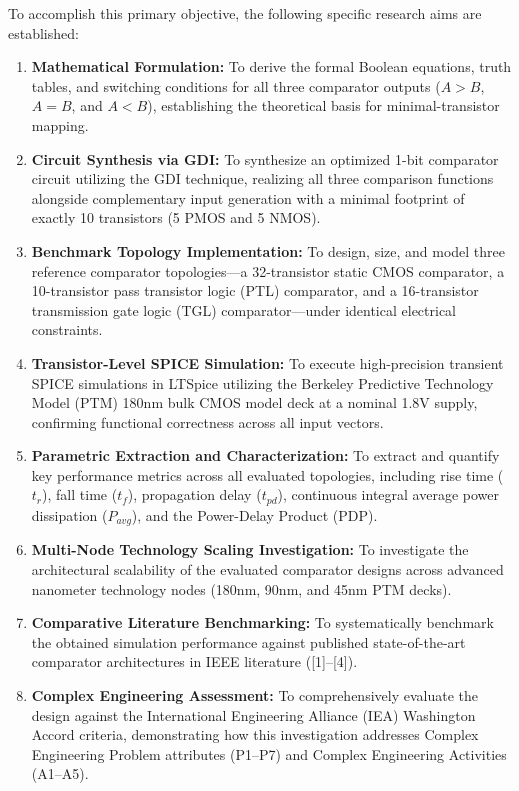 \documentclass[12pt,a4paper,oneside]{report}
\begin{document}
To accomplish this primary objective, the following specific research aims are established:
\begin{enumerate}
\item \textbf{Mathematical Formulation:} To derive the formal Boolean equations, truth tables, and switching conditions for all three comparator outputs ($A>B$, $A=B$, and $A<B$), establishing the theoretical basis for minimal-transistor mapping.
\item \textbf{Circuit Synthesis via GDI:} To synthesize an optimized 1-bit comparator circuit utilizing the GDI technique, realizing all three comparison functions alongside complementary input generation with a minimal footprint of exactly 10 transistors (5 PMOS and 5 NMOS).
\item \textbf{Benchmark Topology Implementation:} To design, size, and model three reference comparator topologies—a 32-transistor static CMOS comparator, a 10-transistor pass transistor logic (PTL) comparator, and a 16-transistor transmission gate logic (TGL) comparator—under identical electrical constraints.
\item \textbf{Transistor-Level SPICE Simulation:} To execute high-precision transient SPICE simulations in LTSpice utilizing the Berkeley Predictive Technology Model (PTM) 180nm bulk CMOS model deck at a nominal 1.8V supply, confirming functional correctness across all input vectors.
\item \textbf{Parametric Extraction and Characterization:} To extract and quantify key performance metrics across all evaluated topologies, including rise time ($t_r$), fall time ($t_f$), propagation delay ($t_{pd}$), continuous integral average power dissipation ($P_{avg}$), and the Power-Delay Product (PDP).
\item \textbf{Multi-Node Technology Scaling Investigation:} To investigate the architectural scalability of the evaluated comparator designs across advanced nanometer technology nodes (180nm, 90nm, and 45nm PTM decks).
\item \textbf{Comparative Literature Benchmarking:} To systematically benchmark the obtained simulation performance against published state-of-the-art comparator architectures in IEEE literature ([1]--[4]).
\item \textbf{Complex Engineering Assessment:} To comprehensively evaluate the design against the International Engineering Alliance (IEA) Washington Accord criteria, demonstrating how this investigation addresses Complex Engineering Problem attributes (P1--P7) and Complex Engineering Activities (A1--A5).
\end{enumerate}
\end{document}

